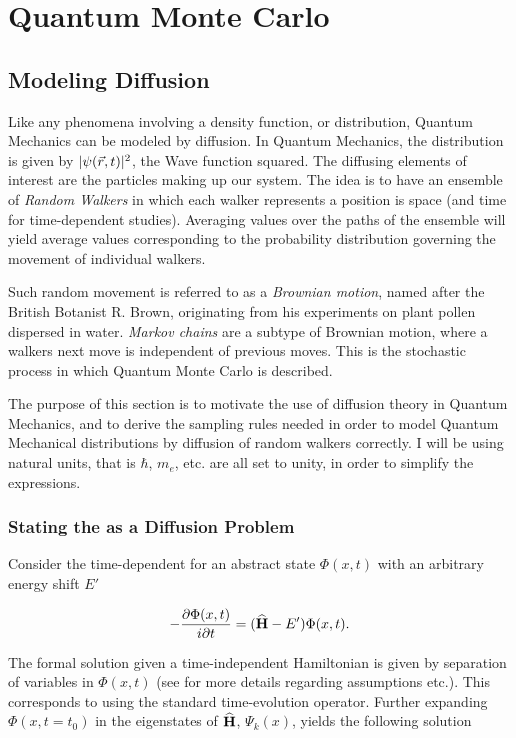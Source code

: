 \chapter{Quantum Monte Carlo}

\section{Modeling Diffusion}

Like any phenomena involving a density function, or distribution, Quantum Mechanics can be modeled by diffusion. In Quantum Mechanics, the distribution is given by $|\psi(\vec r, t)|^2$, the Wave function squared. The diffusing elements of interest are the particles making up our system. The idea is to have an ensemble of \textit{Random Walkers} in which each walker represents a position is space (and time for time-dependent studies). Averaging values over the paths of the ensemble will yield average values corresponding to the probability distribution governing the movement of individual walkers. 

Such random movement is referred to as a \textit{Brownian motion}, named after the British Botanist R. Brown, originating from his experiments on plant pollen dispersed in water. \textit{Markov chains} are a subtype of Brownian motion, where a walkers next move is independent of previous moves. This is the stochastic process in which Quantum Monte Carlo is described.

The purpose of this section is to motivate the use of diffusion theory in Quantum Mechanics, and to derive the sampling rules needed in order to model Quantum Mechanical distributions by diffusion of random walkers correctly. I will be using natural units, that is $\hbar$, $m_e$, etc. are all set to unity, in order to simplify the expressions.

\subsection{Stating the \schrodinger as a Diffusion Problem}

Consider the time-dependent \schrodinger for an abstract state $\Phi(x, t)$ with an arbitrary energy shift $E'$

\begin{equation}
 -\frac{\partial \Phi(x, t)}{i\partial t} = ({\bf\widehat{H}} - E')\Phi(x, t).
\end{equation}

The formal solution given a time-independent Hamiltonian is given by separation of variables in $\Phi(x, t)$ (see \cite{griffiths} for more details regarding assumptions etc.). This corresponds to using the standard time-evolution operator. Further expanding $\Phi(x, t=t_0)$ in the eigenstates of ${\bf\widehat{H}}$, $\Psi_k(x)$, yields the following solution

